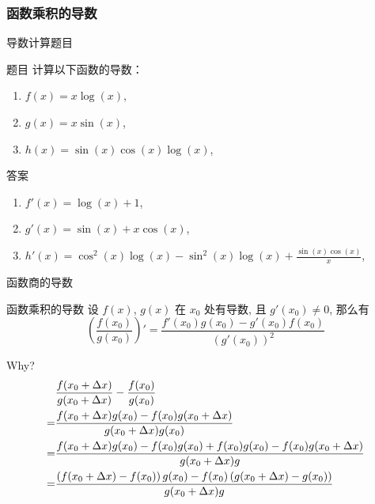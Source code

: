 \documentclass[
10pt,
aspectratio=43,
]{beamer}
\begin{document}
\begin{frame}
	\frametitle{函数乘积的导数}{导数计算题目}
		
	\begin{exampleblock}{题目}
		计算以下函数的导数：
		\begin{enumerate}
			\item $f(x) = x \log(x)$,
			\item $g(x) = x \sin(x)$,
			\item $h(x) = \sin(x) \cos(x) \log(x)$,
		\end{enumerate}
	\end{exampleblock}
		
	\pause
		
	\begin{exampleblock}{答案}
		\begin{enumerate}
			\item $f'(x) = \log(x) + 1$,
			\item $g'(x) = \sin(x) + x \cos(x)$,
			\item $h'(x) = \cos^2(x) \log(x) - \sin^2(x) \log(x) + \displaystyle\frac{\sin(x)\cos(x)}{x}$,
		\end{enumerate}
	\end{exampleblock}
		
\end{frame}

\begin{frame}{函数商的导数}
	\begin{block}{函数乘积的导数}
		设 $f(x)$, $g(x)$ 在 $x_0$ 处有导数, 且 $g'(x_0)\neq 0$, 那么有
		\[
			\left(\frac{f(x_0)}{g(x_0)}\right)' = \frac{f'(x_0)g(x_0)-g'(x_0)f(x_0)}{(g'(x_0))^2}
		\]
	\end{block}
	Why?
	\begin{align*}
		  & \frac{f(x_0+\Delta x)}{g(x_0+\Delta x)}-\frac{f(x_0)}{g(x_0)}                                                \\\bigskip 
		= & \frac{f(x_0+\Delta x)g(x_0)-f(x_0)g(x_0+\Delta x)}{g(x_0+\Delta x)g(x_0)}                                    \\\bigskip
		= & \frac{f(x_0+\Delta x)g(x_0)-f(x_0)g(x_0)+f(x_0)g(x_0)-f(x_0)g(x_0+\Delta x)}{g(x_0+\Delta x)g}               \\\bigskip
		= & \frac{\left(f(x_0+\Delta x)-f(x_0)\right)g(x_0)-f(x_0)\left(g(x_0+\Delta x)-g(x_0)\right)}{g(x_0+\Delta x)g} 
	\end{align*}
\end{frame}
\end{document}
